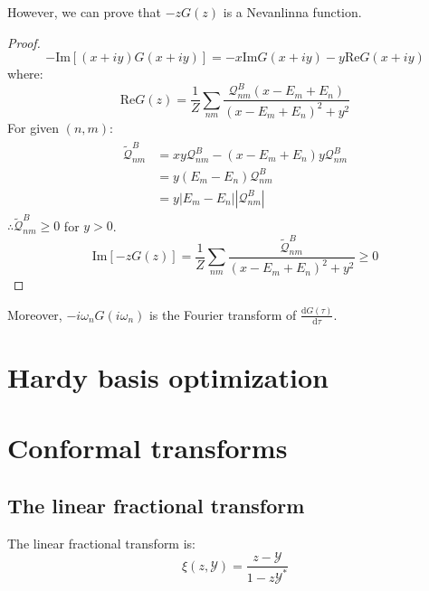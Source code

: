 \documentclass[
	preprint,%
	aps,
	prb,
	showpacs,	
	amsmath, amssymb]{revtex4-2}
\newcommand{\im}{ {\mathrm{Im}} }
\newcommand{\re}{ {\mathrm{Re}} }
\newcommand{\Y}{ {\mathcal{Y}} }
\begin{document}
However, we can prove that $-zG(z)$ is a Nevanlinna function.
\begin{proof}
	\begin{equation}
	-\im[(x + iy) G(x+iy)]= -x\im G(x+iy) - y\re G(x+iy)
	\end{equation}
	where:
	\begin{equation}\label{eq:real-bose-GF}
		\re G(z) = \frac{1}{Z} \sum_{nm} 
			\frac{\mathcal{Q}^B_{nm}(x - E_m + E_n)}
			{(x - E_m + E_n)^2 + y^2}
	\end{equation}
	For given $(n,m)$:
	\begin{align}
	\begin{split}
		\tilde{\mathcal{Q}}^B_{nm} 
		&= xy\mathcal{Q}^B_{nm} - (x-E_m + E_n)y\mathcal{Q}^B_{nm} \\
		&= y(E_m - E_n)\mathcal{Q}^B_{nm} \\
		&= y|E_m - E_n||\mathcal{Q}^B_{nm}|
	\end{split}
	\end{align}
	$\therefore \tilde{\mathcal{Q}}^B_{nm} \geq 0$ for $y > 0$.
	\begin{equation}
		\im[-zG(z)] = \frac{1}{Z} \sum_{nm} 
		\frac{\tilde{\mathcal{Q}}^B_{nm}}
		{(x - E_m + E_n)^2 + y^2} \geq 0
	\end{equation}

\end{proof}

Moreover, $-i\omega_n G(i\omega_n)$ is the Fourier transform of 
$\frac{\mathrm{d}G(\tau)}{\mathrm{d} \tau}$.


\section{Hardy basis optimization}
\label{sec:hardy-basis-optimization}



\appendix
\section{Conformal transforms}
\label{app:conformal-transforms}

\subsection{The linear fractional transform}
\label{appsub:linear-fractional-transform}
The linear fractional transform is:
\begin{equation}\label{eq:linear-fractional-transform}
	\xi(z, \Y) = \frac{z - \Y}{1 - z\Y^*}
\end{equation}
\end{document}
